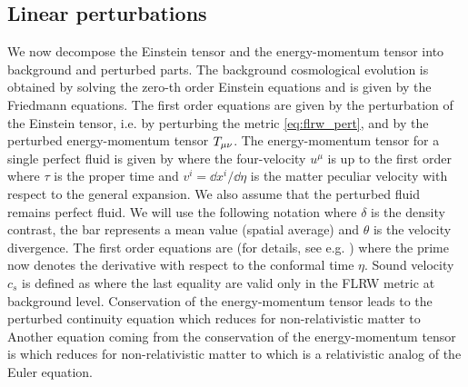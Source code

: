 \subsection{Linear perturbations}
We now decompose the Einstein tensor and the energy-momentum tensor into background and perturbed parts. The background cosmological evolution is obtained by solving the zero-th order Einstein equations and is given by the Friedmann equations. The first order equations are given by the perturbation of the Einstein tensor, i.e. by perturbing the metric \autoref{eq:flrw_pert}, and by the perturbed energy-momentum tensor $T_{\mu\nu}$. The energy-momentum tensor for a single perfect fluid is given by
where the four-velocity $u^\mu$ is up to the first order
where $\tau$ is the proper time and $v^i=\dd x^i/\dd\eta$ is the matter peculiar velocity with respect to the general expansion. We also assume that the perturbed fluid remains perfect fluid. We will use the following notation
where $\delta$ is the density contrast, the bar represents a mean value (spatial average) and $\theta$ is the velocity divergence. The first order equations are (for details, see e.g. \cite{2002col.luc..cosmology,10.1143/PTPS.78.1})
where the prime now denotes the derivative with respect to the conformal time $\eta$. Sound velocity $c_s$ is defined as
where the last equality are valid only in the FLRW metric at background level. Conservation of the energy-momentum tensor leads to the perturbed continuity equation
which reduces for non-relativistic matter to
Another equation coming from the conservation of the energy-momentum tensor is
which reduces for non-relativistic matter to
which is a relativistic analog of the Euler equation.


